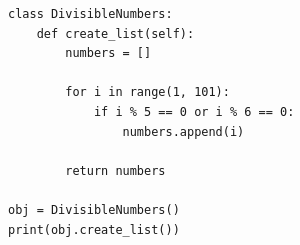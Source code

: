 \begin{verbatim}
class DivisibleNumbers:
    def create_list(self):
        numbers = []

        for i in range(1, 101):
            if i % 5 == 0 or i % 6 == 0:
                numbers.append(i)

        return numbers

obj = DivisibleNumbers()
print(obj.create_list())
\end{verbatim}